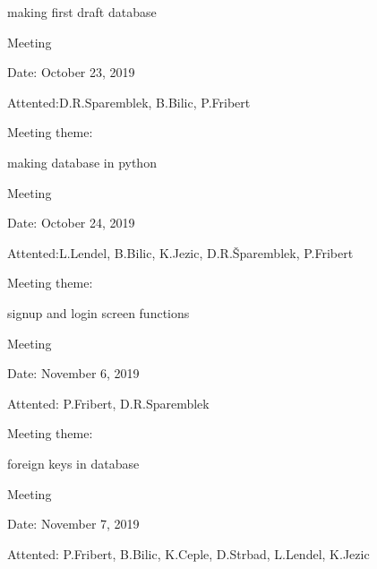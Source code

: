 \begin{packed_enum}
\begin{packed_item}
				\begin{packed_item}
					\item  making first draft database
				\end{packed_item}
			\end{packed_item}
			\item  Meeting
			\item[] \begin{packed_item}
				\item Date: October 23, 2019
				\item Attented:D.R.Sparemblek, B.Bilic, P.Fribert
				\item Meeting theme:
				\begin{packed_item}
					\item  making database in python
				\end{packed_item}
			\end{packed_item}
			\item  Meeting
			\item[] \begin{packed_item}
				\item Date: October 24, 2019
				\item Attented:L.Lendel, B.Bilic, K.Jezic, D.R.Šparemblek, P.Fribert
				\item Meeting theme:
				\begin{packed_item}
					\item  signup and login screen functions
				\end{packed_item}
			\end{packed_item}
			\item  Meeting
			\item[] \begin{packed_item}
				\item Date: November 6, 2019
				\item Attented: P.Fribert, D.R.Sparemblek
				\item Meeting theme:
				\begin{packed_item}
					\item  foreign keys in database
				\end{packed_item}
			\end{packed_item}
			\item  Meeting
			\item[] \begin{packed_item}
				\item Date: November 7, 2019
				\item Attented: P.Fribert, B.Bilic, K.Ceple, D.Strbad, L.Lendel, K.Jezic

\end{packed_item}
\end{packed_enum}
